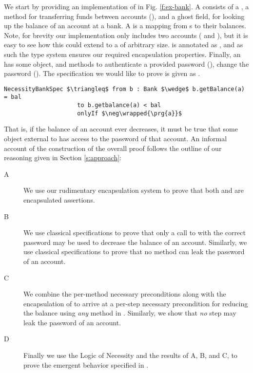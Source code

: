 We start by providing an implementation of  in Fig. \ref{f:ex-bank}.
A  consists of a , a method for transferring 
funds between accounts (), and a ghost field, 
for looking up the balance of an account at a bank. 
A  is
a mapping from s to their balances. Note, for brevity
our implementation only includes two accounts ( and ),
but it is easy to see how this could extend to a 
of arbitrary size.  is annotated as \enclosed, and as 
such the type system ensures our required encapsulation properties.
Finally, an  has some  object, and 
methods to authenticate a provided password (), 
change the password ().
The specification we would like to prove is given as .
\begin{lstlisting}[language = Chainmail, mathescape=true, frame=lines]
NecessityBankSpec $\triangleq$ from b : Bank $\wedge$ b.getBalance(a) = bal 
                     to b.getbalance(a) < bal
                     onlyIf $\neg\wrapped{\prg{a}}$
\end{lstlisting}
That is, if the balance of an account ever decreases, it must be true that some object external to
 has access to the password of that account. An informal account of the construction of 
the overall proof follows the outline of our reasoning given in Section \ref{s:approach}:
\begin{description}
\item[A]
We use our rudimentary encapsulation system to prove that both  and  are encapsulated assertions.
\item[B]
We use classical specifications to prove that only a call to  
with the correct password may be used to decrease the balance of an account. Similarly, we
use classical specifications to prove that no method can leak the password of an account.
\item[C]
We combine the per-method necessary preconditions along with the encapsulation of  to arrive at a per-step
necessary precondition for reducing the balance using \emph{any} method in . Similarly, 
we show that \emph{no} step may leak the password of an account.
\item[D]
Finally we use the Logic of Necessity and the results of A, B, and C, to prove the emergent behavior specified in .
\end{description}

